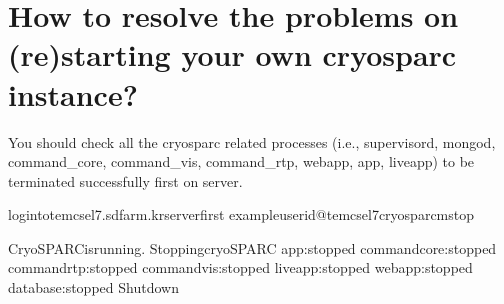 \documentclass[a4paper,11pt,english]{sphinxmanual}
\begin{document}
\section{How to resolve the problems on (re)starting your own cryosparc instance?}
\label{\detokenize{faq:how-to-resolve-the-problems-on-re-starting-your-own-cryosparc-instance}}\label{\detokenize{faq:id1}}
\sphinxAtStartPar
You should check all the cryosparc related processes (i.e., supervisord, mongod, command\_core, command\_vis, command\_rtp, webapp, app, liveapp) to be terminated successfully first on  server.

\begin{sphinxVerbatim}[commandchars=\\\{\}]
logintotem\PYGZhy{}cs\PYGZhy{}el7.sdfarm.krserverfirst
exampleuserid@tem\PYGZhy{}cs\PYGZhy{}el7\PYGZdl{}\PYGZgt{}cryosparcmstop

CryoSPARCisrunning.
StoppingcryoSPARC
app:stopped
command\PYGZus{}core:stopped
command\PYGZus{}rtp:stopped
command\PYGZus{}vis:stopped
liveapp:stopped
webapp:stopped
database:stopped
Shutdown


\end{sphinxVerbatim}
\end{document}
